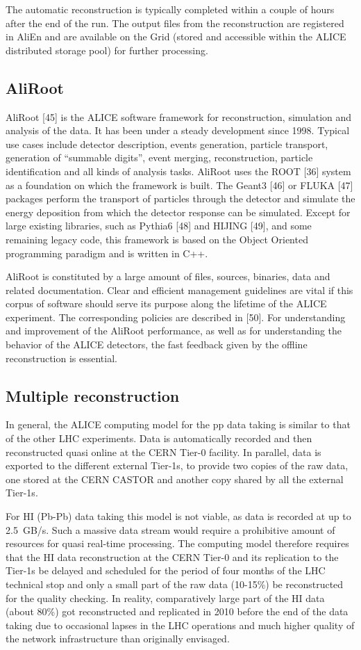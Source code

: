 The automatic reconstruction is typically completed within a couple
of hours after the end of the run. The output files from the
reconstruction are registered in AliEn and are available on the Grid
(stored and accessible within the ALICE distributed storage pool)
for further processing.

\subsection{AliRoot}
%
AliRoot [45] is the ALICE software framework for reconstruction, simulation and
analysis of the data. It has been under a steady
development since 1998. Typical use cases include detector
description, events generation, particle transport, generation of
``summable digits'', event merging, reconstruction, particle
identification and all kinds of analysis tasks. AliRoot uses the
ROOT [36] system as a foundation on which the framework is built. The Geant3 [46] or
FLUKA [47] packages perform the transport of particles through the
detector and simulate the energy deposition from which the detector
response can be simulated. Except for large existing libraries, such
as Pythia6 [48] and HIJING [49], and some remaining legacy code,
this framework is based on the Object Oriented programming paradigm
and is written in C++.

AliRoot is constituted by a large amount of files, sources,
binaries, data and related documentation. Clear and efficient
management guidelines are vital if this corpus of software should
serve its purpose along the lifetime of the ALICE experiment. The
corresponding policies are described in [50].  For understanding and
improvement of the AliRoot performance, as well as for understanding
the behavior of the ALICE detectors, the fast feedback given by the
offline reconstruction is essential.

\subsection{Multiple reconstruction}
%
In general, the ALICE computing model for the pp data taking is
similar to that of the other LHC experiments. Data is automatically
recorded and then reconstructed quasi online at the CERN Tier-0
facility. In parallel, data is exported to the different external
Tier-1s, to provide two copies of the raw data, one stored at the
CERN CASTOR and another copy shared by all the external Tier-1s.

For HI (Pb-Pb) data taking this model is not viable, as data is
recorded at up to 2.5~GB/s.  Such a massive data stream would
require a prohibitive amount of resources for quasi real-time
processing. The computing model therefore requires that the HI data
reconstruction at the CERN Tier-0 and its replication to the Tier-1s
be delayed and scheduled for the period of four months of the LHC
technical stop and only a small part of the raw data (10-15\%) be
reconstructed for the quality checking. In reality, comparatively
large part of the HI data (about 80\%) got reconstructed and
replicated in 2010 before the end of the data taking due to
occasional lapses in the LHC operations and much higher quality of
the network infrastructure than originally envisaged.

